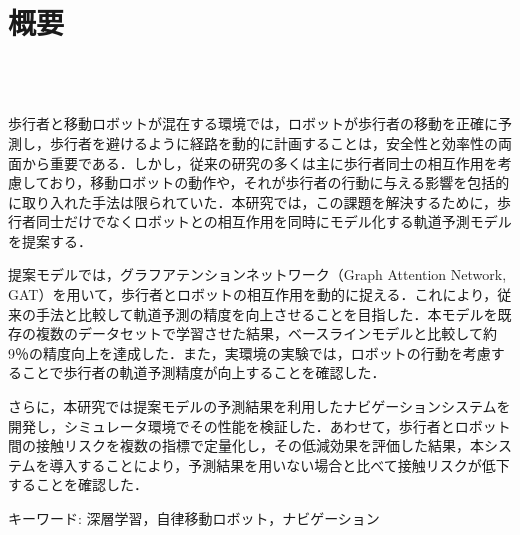 \chapter*{概要}
\thispagestyle{empty}
%
\begin{center}
  \scalebox{1.5}{移動ロボットのための深層学習を用いた}\\
  \scalebox{1.5}{歩行者の位置予測とナビゲーションへの応用}\\
\end{center}
\vspace{1.0zh}
%

歩行者と移動ロボットが混在する環境では，ロボットが歩行者の移動を正確に予測し，歩行者を避けるように経路を動的に計画することは，安全性と効率性の両面から重要である．しかし，従来の研究の多くは主に歩行者同士の相互作用を考慮しており，移動ロボットの動作や，それが歩行者の行動に与える影響を包括的に取り入れた手法は限られていた．本研究では，この課題を解決するために，歩行者同士だけでなくロボットとの相互作用を同時にモデル化する軌道予測モデルを提案する．

提案モデルでは，グラフアテンションネットワーク（Graph Attention Network, GAT）を用いて，歩行者とロボットの相互作用を動的に捉える．これにより，従来の手法と比較して軌道予測の精度を向上させることを目指した．本モデルを既存の複数のデータセットで学習させた結果，ベースラインモデルと比較して約9％の精度向上を達成した．また，実環境の実験では，ロボットの行動を考慮することで歩行者の軌道予測精度が向上することを確認した．

さらに，本研究では提案モデルの予測結果を利用したナビゲーションシステムを開発し，シミュレータ環境でその性能を検証した．あわせて，歩行者とロボット間の接触リスクを複数の指標で定量化し，その低減効果を評価した結果，本システムを導入することにより，予測結果を用いない場合と比べて接触リスクが低下することを確認した．

\begin{flushleft}
キーワード: 深層学習，自律移動ロボット，ナビゲーション
\end{flushleft}
%
\newpage
